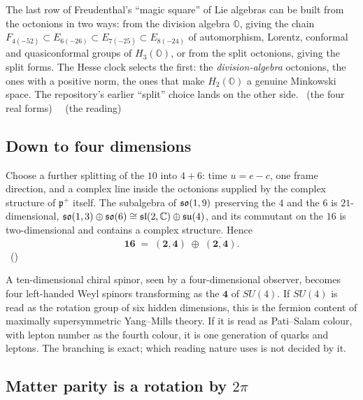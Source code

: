 \begin{physical}
The last row of Freudenthal's ``magic square'' of Lie algebras can be built from the octonions
in two ways: from the division algebra $\mathbb O$, giving the chain
$F_{4(-52)}\subset E_{6(-26)}\subset E_{7(-25)}\subset E_{8(-24)}$ of automorphism, Lorentz,
conformal and quasiconformal groups of $H_3(\mathbb O)$, or from the split octonions, giving
the split forms. The Hesse clock selects the first: the \emph{division-algebra} octonions, the
ones with a positive norm, the ones that make $H_2(\mathbb O)$ a genuine Minkowski space. The
repository's earlier ``split'' choice lands on the other side. \tierC\ (the four real forms)
\ \tierB\ (the reading)
\end{physical}

\subsection{Down to four dimensions}

Choose a further splitting of the $10$ into $4+6$: time $u=e-c$, one frame direction, and
a complex line inside the octonions supplied by the complex structure of $\mathfrak p^+$
itself. The subalgebra of $\mathfrak{so}(1,9)$ preserving the $4$ and the $6$ is $21$-dimensional,
$\mathfrak{so}(1,3)\oplus\mathfrak{so}(6)\cong\mathfrak{sl}(2,\mathbb{C})\oplus\mathfrak{su}(4)$, and its commutant on
the $16$ is two-dimensional and contains a complex structure. Hence
\[
\mathbf{16}\;=\;(\mathbf2,\mathbf4)\;\oplus\;\overline{(\mathbf2,\mathbf4)} .
\]
\tierC\ ()

\begin{physical}
A ten-dimensional chiral spinor, seen by a four-dimensional observer, becomes four
left-handed Weyl spinors transforming as the $\mathbf4$ of $SU(4)$. If $SU(4)$ is read as
the rotation group of six hidden dimensions, this is the fermion content of maximally
supersymmetric Yang--Mills theory. If it is read as Pati--Salam colour, with lepton number
as the fourth colour, it is one generation of quarks and leptons. The branching is exact;
which reading nature uses is not decided by it. \tierB
\end{physical}

\subsection{Matter parity is a rotation by \texorpdfstring{$2\pi$}{2 pi}}

